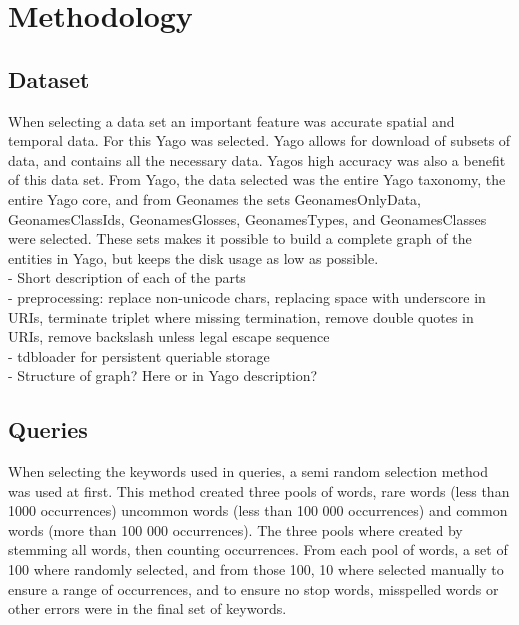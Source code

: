 
\chapter{Methodology}

\section{Dataset}
When selecting a data set an important feature was accurate spatial and temporal data. For this Yago was selected. Yago allows for download of subsets of data, and contains all the necessary data. Yagos high accuracy was also a benefit of this data set. From Yago, the data selected was the entire Yago taxonomy, the entire Yago core, and from Geonames the sets GeonamesOnlyData, GeonamesClassIds, GeonamesGlosses, GeonamesTypes, and GeonamesClasses were selected. These sets makes it possible to build a complete graph of the entities in Yago, but keeps the disk usage as low as possible.\\

- Short description of each of the parts\\
- preprocessing: replace non-unicode chars, replacing space with underscore in URIs, terminate triplet where missing termination, remove double quotes in URIs, remove backslash unless legal escape sequence\\
- tdbloader for persistent queriable storage\\
- Structure of graph? Here or in Yago description?\\


\section{Queries}
When selecting the keywords used in queries, a semi random selection method was used at first. This method created three pools of words, rare words (less than 1000 occurrences) uncommon words (less than 100 000 occurrences) and common words (more than 100 000 occurrences). The three pools where created by stemming all words, then counting occurrences. From each pool of words, a set of 100 where randomly selected, and from those 100, 10 where selected manually to ensure a range of occurrences, and to ensure no stop words, misspelled words or other errors were in the final set of keywords.\\

